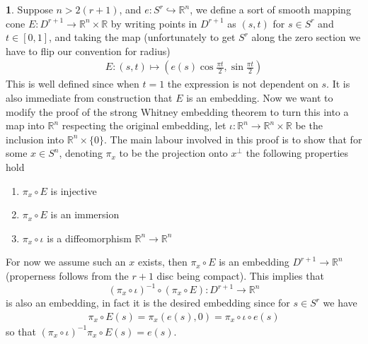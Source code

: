 \documentclass[10.5pt]{article}
\theoremstyle{definition}
\newtheorem{pb}{}
\newcommand{\set}[1]{\{#1\}}
\begin{document}
    \begin{pb}
        Suppose \(n > 2(r+1)\), and \(e: S^r \hookrightarrow \mathbb{R}^n\), we define a sort of smooth mapping cone \(E: D^{r+1} \to \mathbb{R}^n \times \mathbb{R}\) by writing points in \(D^{r+1}\) as \((s,t)\) for \(s \in S^r\) and \(t \in [0,1]\), and taking the map (unfortunately to get \(S^r\) along the zero section we have to flip our convention for radius)
        \begin{align*}
            E:(s,t) \mapsto \left(e(s)\cos\frac{\pi t}{2},\sin\frac{\pi t}{2}\right)
        \end{align*}
        This is well defined since when \(t = 1\) the expression is not dependent on \(s\). It is also immediate from construction that \(E\) is an embedding. Now we want to modify the proof of the strong Whitney embedding theorem to turn this into a map into \(\mathbb{R}^n\) respecting the original embedding, let \(\iota: \mathbb{R}^n \to \mathbb{R}^n\times \mathbb{R}\) be the inclusion into \(\mathbb{R}^n \times \set{0}\). The main labour involved in this proof is to show that for some \(x \in S^n\), denoting \(\pi_x\) to be the projection onto \(x^\perp\) the following properties hold
        \begin{enumerate}
            \item \(\pi_x \circ E\) is injective
            \item \(\pi_x \circ E\) is an immersion
            \item \(\pi_x \circ \iota\) is a diffeomorphism \(\mathbb{R}^n \to \mathbb{R}^n\)
        \end{enumerate}
        For now we assume such an \(x\) exists, then \(\pi_x \circ E\) is an embedding \(D^{r+1} \to \mathbb{R}^n\) (properness follows from the \(r+1\) disc being compact). This implies that \[(\pi_x \circ \iota)^{-1}\circ(\pi_x\circ E): D^{r+1} \to \mathbb{R}^n\] is also an embedding, in fact it is the desired embedding since for \(s \in S^r\) we have
        \begin{align*}
            \pi_x\circ E(s) = \pi_x(e(s),0) = \pi_x\circ\iota\circ e(s)
        \end{align*}
        so that \((\pi_x\circ \iota)^{-1}\pi_x\circ E(s) = e(s)\).


\end{pb}
\end{document}
